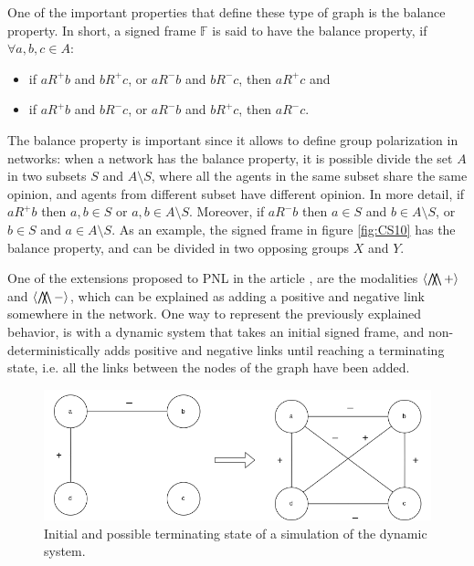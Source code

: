 One of the important properties that define these type of graph is the balance property. In short, a signed frame $\mathbb{F}$ is said to have the balance property, if $\forall a,b,c \in A$:
\begin{itemize}
    \item if $aR^+b$ and $bR^+c$, or $aR^-b$ and $bR^-c$, then $aR^+c$ and
    \item if $aR^+b$ and $bR^-  c$, or $aR^-b$ and $bR^+c$, then $aR^-c$.
\end{itemize}
The balance property is important since it allows to define group polarization in networks: when a network has the balance property, it is possible divide the set $A$ in two subsets $S$ and $A \setminus S$, where all the agents in the same subset share the same opinion, and agents from different subset have different opinion. In more detail, if $aR^+b$ then $a,b \in S$ or $a,b \in A \setminus S$. Moreover, if $aR^-b$ then $a \in S$ and $b \in A \setminus S$, or $b \in S$ and $a \in A \setminus S$. As an example, the signed frame in figure \ref{fig:CS10} has the balance property, and can be divided in two opposing groups $X$ and $Y$.

One of the extensions proposed to PNL in the article \cite{PNL1}, are the modalities $\langle \operatorname*{\bigwedge\mkern-12mu\bigwedge} +\rangle$ and $\langle \operatorname*{\bigwedge\mkern-12mu\bigwedge} - \rangle$, which can be explained as adding a positive and negative link somewhere in the network. One way to represent the previously explained behavior, is with a dynamic system that takes an initial signed frame, and non-deterministically adds positive and negative links until reaching a terminating state, i.e. all the links between the nodes of the graph have been added.

\begin{figure}[H]
    \centering
    \includegraphics[scale=0.5]{images/CS11.png}
    \caption{Initial and possible terminating state of a simulation of the dynamic system.}
    \label{fig:CS11}
\end{figure}

